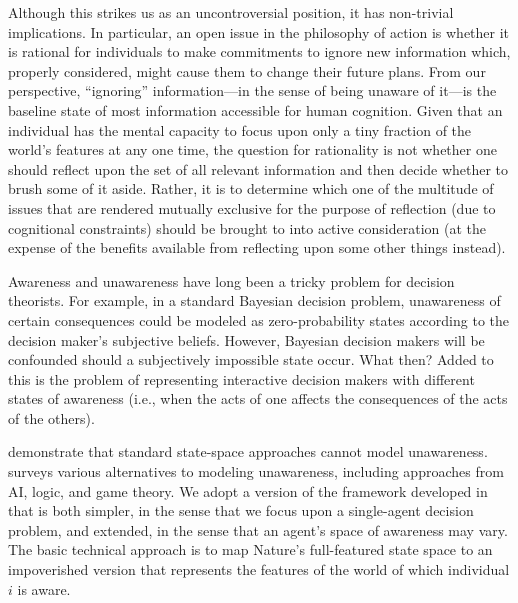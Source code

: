 \documentclass[
11pt,
titlepage,
reqno,
]{article}%
\theoremstyle{definition}
\begin{document}
Although this strikes us as an uncontroversial position, it has non-trivial implications.
In particular, an open issue in the philosophy of action is whether it is rational for individuals to make commitments to ignore new information which, properly considered, might cause them to change their future plans.
From our perspective, ``ignoring'' information---in the sense of being unaware of it---is the baseline state of most information accessible for human cognition.
Given that an individual has the mental capacity to focus upon only a tiny fraction of the world's features at any one time, the question for rationality is not whether one should reflect upon the set of all relevant information and then decide whether to brush some of it aside.
Rather, it is to determine which one of the multitude of issues that are rendered mutually exclusive for the purpose of reflection (due to cognitional constraints) should be brought to into active consideration (at the expense of the benefits available from reflecting upon some other things instead).

Awareness and unawareness have long been a tricky problem for decision theorists. 
For example, in a standard Bayesian decision problem, unawareness of certain consequences could be modeled as zero-probability states according to the decision maker's subjective beliefs. 
However, Bayesian decision makers will be confounded should a subjectively impossible state occur. 
What then?
Added to this is the problem of representing interactive decision makers with different states of awareness (i.e., when the acts of one affects the consequences of the acts of the others). 

\citet{Dekel1998} demonstrate that standard state-space approaches cannot model unawareness. 
\citet{Schipper2015} surveys various alternatives to modeling unawareness, including approaches from  AI, logic, and game theory. 
We adopt a version of the framework developed in \citet{Heifetz2006} \citep[also see][for related extensions]{Heifetz2008,Heifetz2013} that is both simpler, in the sense that we focus upon a single-agent decision problem, and extended, in the sense that an agent's space of awareness may vary.
The basic technical approach is to map Nature's full-featured state space to an impoverished version that represents the features of the world of which individual $i$ is aware.
\end{document}
